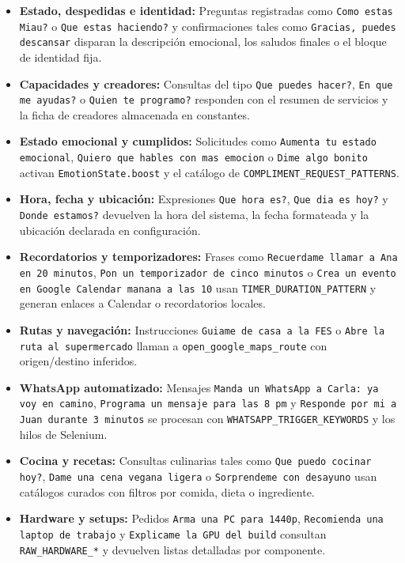\documentclass[a4paper,12pt]{article}
\begin{document}
\begin{itemize}
    \item \textbf{Estado, despedidas e identidad:} Preguntas registradas como \texttt{Como estas Miau?} o \texttt{Que estas haciendo?} y confirmaciones tales como \texttt{Gracias, puedes descansar} disparan la descripci\'on emocional, los saludos finales o el bloque de identidad fija.
    \item \textbf{Capacidades y creadores:} Consultas del tipo \texttt{Que puedes hacer?}, \texttt{En que me ayudas?} o \texttt{Quien te programo?} responden con el resumen de servicios y la ficha de creadores almacenada en constantes.
    \item \textbf{Estado emocional y cumplidos:} Solicitudes como \texttt{Aumenta tu estado emocional}, \texttt{Quiero que hables con mas emocion} o \texttt{Dime algo bonito} activan \texttt{EmotionState.boost} y el cat\'alogo de \texttt{COMPLIMENT\_REQUEST\_PATTERNS}.
    \item \textbf{Hora, fecha y ubicaci\'on:} Expresiones \texttt{Que hora es?}, \texttt{Que dia es hoy?} y \texttt{Donde estamos?} devuelven la hora del sistema, la fecha formateada y la ubicaci\'on declarada en configuraci\'on.
    \item \textbf{Recordatorios y temporizadores:} Frases como \texttt{Recuerdame llamar a Ana en 20 minutos}, \texttt{Pon un temporizador de cinco minutos} o \texttt{Crea un evento en Google Calendar manana a las 10} usan \texttt{TIMER\_DURATION\_PATTERN} y generan enlaces a Calendar o recordatorios locales.
    \item \textbf{Rutas y navegaci\'on:} Instrucciones \texttt{Guiame de casa a la FES} o \texttt{Abre la ruta al supermercado} llaman a \texttt{open\_google\_maps\_route} con origen/destino inferidos.
    \item \textbf{WhatsApp automatizado:} Mensajes \texttt{Manda un WhatsApp a Carla: ya voy en camino}, \texttt{Programa un mensaje para las 8 pm} y \texttt{Responde por mi a Juan durante 3 minutos} se procesan con \texttt{WHATSAPP\_TRIGGER\_KEYWORDS} y los hilos de Selenium.
    \item \textbf{Cocina y recetas:} Consultas culinarias tales como \texttt{Que puedo cocinar hoy?}, \texttt{Dame una cena vegana ligera} o \texttt{Sorprendeme con desayuno} usan cat\'alogos curados con filtros por comida, dieta o ingrediente.
    \item \textbf{Hardware y setups:} Pedidos \texttt{Arma una PC para 1440p}, \texttt{Recomienda una laptop de trabajo} y \texttt{Explicame la GPU del build} consultan \texttt{RAW\_HARDWARE\_*} y devuelven listas detalladas por componente.

\end{itemize}
\end{document}
